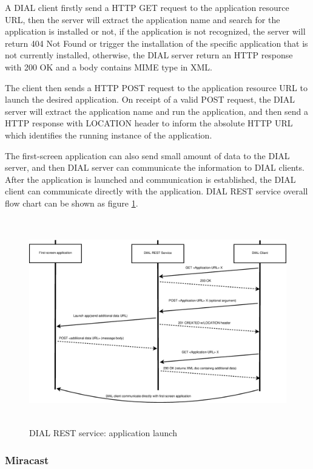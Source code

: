 \begin{enumerate}
A DIAL client firstly send a HTTP GET request to the application resource URL, 
then the server will extract the application name and search for the 
application is installed or not, if the application is not recognized, the 
server will return 404 Not Found or trigger the installation of the specific 
application that is not currently installed, otherwise, the DIAL server return 
an HTTP response with 200 OK and a body contains MIME type in XML. 

The client then sends a HTTP POST request to the application resource URL to 
launch the desired application. On receipt of a valid POST request, the DIAL 
server will extract the application name and run the application, and then send 
a HTTP response with LOCATION header to inform the absolute HTTP URL which 
identifies the running instance of the application. 

The first-screen application can also send small amount of data to the DIAL 
server, and then DIAL server can communicate the information to DIAL clients. 
After the application is launched and communication is established, the DIAL 
client can communicate directly with the application. DIAL REST service overall 
flow chart can be shown as figure \ref{dial_rest}. 

\begin{figure}[htb] \centering \includegraphics[height=9cm]{charts/dial_rest} 
\caption{DIAL REST service: application launch \label{dial_rest}} 
\end{figure} 
\end{enumerate} 

\subsubsection{Miracast} 

